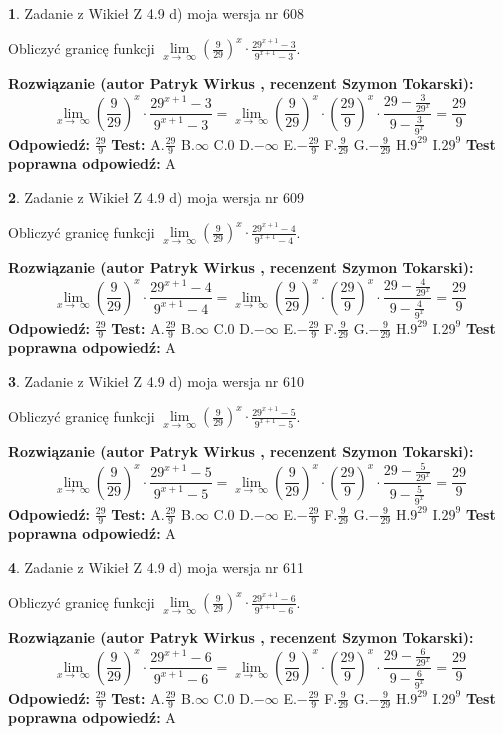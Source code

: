 \documentclass[12pt, a4paper]{article}
\theoremstyle{definition} %
\newtheorem{zad}{}
\newcommand{\zadStart}[1]{\begin{zad}#1\newline}
\newcommand{\zadStop}{\end{zad}}
\newcommand{\rozwStart}[2]{\noindent \textbf{Rozwiązanie (autor #1 , recenzent #2): }\newline}
\newcommand{\rozwStop}{\newline}
\newcommand{\odpStart}{\noindent \textbf{Odpowiedź:}\newline}
\newcommand{\odpStop}{\newline}
\newcommand{\testStart}{\noindent \textbf{Test:}\newline}
\newcommand{\testStop}{\newline}
\newcommand{\kluczStart}{\noindent \textbf{Test poprawna odpowiedź:}\newline}
\newcommand{\kluczStop}{\newline}
\begin{document}
\zadStart{Zadanie z Wikieł Z 4.9 d) moja wersja nr 608}


Obliczyć granicę funkcji  $\lim\limits_{x\to\ \infty}(\frac{9}{29})^{x}\cdot\frac{29^{x+1}-3}{9^{x+1}-3}$.
\zadStop
\rozwStart{Patryk Wirkus}{Szymon Tokarski}
$$\lim\limits_{x\to\ \infty}(\frac{9}{29})^{x}\cdot\frac{29^{x+1}-3}{9^{x+1}-3}=\lim\limits_{x\to\ \infty}(\frac{9}{29})^{x}\cdot(\frac{29}{9})^{x} \cdot \frac{29-\frac{3}{29^{x}}}{9-\frac{3}{9^{x}}} = \frac{29}{9}$$
\rozwStop
\odpStart
$\frac{29}{9}$
\odpStop
\testStart
A.$\frac{29}{9}$ B.$\infty$ C.$0$ D.$-\infty$ E.$-\frac{29}{9}$
F.$\frac{9}{29}$ G.$-\frac{9}{29}$
H.$9^{29}$
I.$29^{9}$
\testStop
\kluczStart
A
\kluczStop



\zadStart{Zadanie z Wikieł Z 4.9 d) moja wersja nr 609}


Obliczyć granicę funkcji  $\lim\limits_{x\to\ \infty}(\frac{9}{29})^{x}\cdot\frac{29^{x+1}-4}{9^{x+1}-4}$.
\zadStop
\rozwStart{Patryk Wirkus}{Szymon Tokarski}
$$\lim\limits_{x\to\ \infty}(\frac{9}{29})^{x}\cdot\frac{29^{x+1}-4}{9^{x+1}-4}=\lim\limits_{x\to\ \infty}(\frac{9}{29})^{x}\cdot(\frac{29}{9})^{x} \cdot \frac{29-\frac{4}{29^{x}}}{9-\frac{4}{9^{x}}} = \frac{29}{9}$$
\rozwStop
\odpStart
$\frac{29}{9}$
\odpStop
\testStart
A.$\frac{29}{9}$ B.$\infty$ C.$0$ D.$-\infty$ E.$-\frac{29}{9}$
F.$\frac{9}{29}$ G.$-\frac{9}{29}$
H.$9^{29}$
I.$29^{9}$
\testStop
\kluczStart
A
\kluczStop



\zadStart{Zadanie z Wikieł Z 4.9 d) moja wersja nr 610}


Obliczyć granicę funkcji  $\lim\limits_{x\to\ \infty}(\frac{9}{29})^{x}\cdot\frac{29^{x+1}-5}{9^{x+1}-5}$.
\zadStop
\rozwStart{Patryk Wirkus}{Szymon Tokarski}
$$\lim\limits_{x\to\ \infty}(\frac{9}{29})^{x}\cdot\frac{29^{x+1}-5}{9^{x+1}-5}=\lim\limits_{x\to\ \infty}(\frac{9}{29})^{x}\cdot(\frac{29}{9})^{x} \cdot \frac{29-\frac{5}{29^{x}}}{9-\frac{5}{9^{x}}} = \frac{29}{9}$$
\rozwStop
\odpStart
$\frac{29}{9}$
\odpStop
\testStart
A.$\frac{29}{9}$ B.$\infty$ C.$0$ D.$-\infty$ E.$-\frac{29}{9}$
F.$\frac{9}{29}$ G.$-\frac{9}{29}$
H.$9^{29}$
I.$29^{9}$
\testStop
\kluczStart
A
\kluczStop



\zadStart{Zadanie z Wikieł Z 4.9 d) moja wersja nr 611}


Obliczyć granicę funkcji  $\lim\limits_{x\to\ \infty}(\frac{9}{29})^{x}\cdot\frac{29^{x+1}-6}{9^{x+1}-6}$.
\zadStop
\rozwStart{Patryk Wirkus}{Szymon Tokarski}
$$\lim\limits_{x\to\ \infty}(\frac{9}{29})^{x}\cdot\frac{29^{x+1}-6}{9^{x+1}-6}=\lim\limits_{x\to\ \infty}(\frac{9}{29})^{x}\cdot(\frac{29}{9})^{x} \cdot \frac{29-\frac{6}{29^{x}}}{9-\frac{6}{9^{x}}} = \frac{29}{9}$$
\rozwStop
\odpStart
$\frac{29}{9}$
\odpStop
\testStart
A.$\frac{29}{9}$ B.$\infty$ C.$0$ D.$-\infty$ E.$-\frac{29}{9}$
F.$\frac{9}{29}$ G.$-\frac{9}{29}$
H.$9^{29}$
I.$29^{9}$
\testStop
\kluczStart
A
\kluczStop
\end{document}
